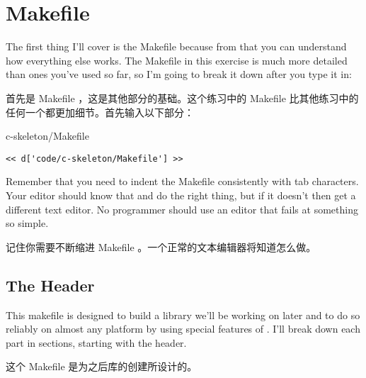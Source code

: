 \section{Makefile}

The first thing I'll cover is the Makefile because from that you can understand
how everything else works.  The Makefile in this exercise is much more detailed
than ones you've used so far, so I'm going to break it down after you type it
in:

首先是 Makefile ，这是其他部分的基础。这个练习中的 Makefile 比其他练习中的任何一个都更加细节。首先输入以下部分：

\begin{code}{c-skeleton/Makefile}
\begin{lstlisting}
<< d['code/c-skeleton/Makefile'] >>
\end{lstlisting}
\end{code}

Remember that you need to indent the Makefile consistently with tab characters.
Your editor should know that and do the right thing, but if it doesn't then get
a different text editor.  No programmer should use an editor that fails at 
something so simple.

记住你需要不断缩进 Makefile 。一个正常的文本编辑器将知道怎么做。

\subsection{The Header}

This makefile is designed to build a library we'll be working on later and 
to do so reliably on almost any platform by using special features of .  I'll break down each part in sections, starting with the header.

这个 Makefile 是为之后库的创建所设计的。

